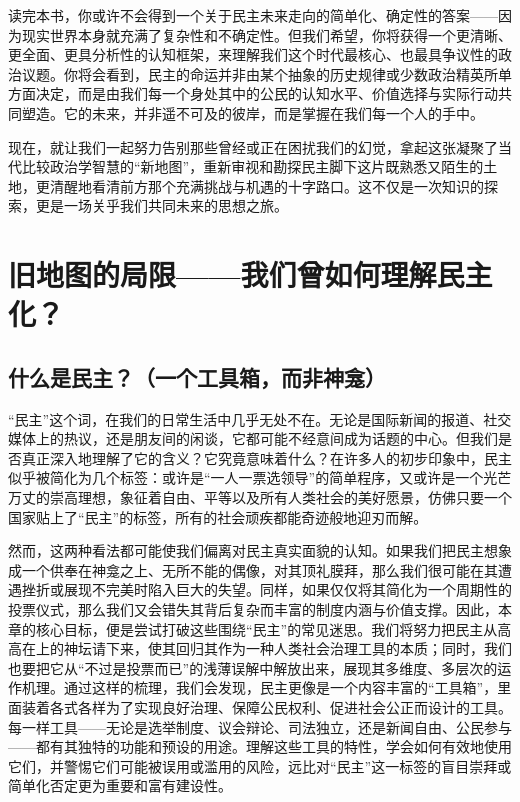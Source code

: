 \documentclass[UTF8, 10pt]{ctexbook}
\begin{document}
读完本书，你或许不会得到一个关于民主未来走向的简单化、确定性的答案——因为现实世界本身就充满了复杂性和不确定性。但我们希望，你将获得一个更清晰、更全面、更具分析性的认知框架，来理解我们这个时代最核心、也最具争议性的政治议题。你将会看到，民主的命运并非由某个抽象的历史规律或少数政治精英所单方面决定，而是由我们每一个身处其中的公民的认知水平、价值选择与实际行动共同塑造。它的未来，并非遥不可及的彼岸，而是掌握在我们每一个人的手中。

现在，就让我们一起努力告别那些曾经或正在困扰我们的幻觉，拿起这张凝聚了当代比较政治学智慧的“新地图”，重新审视和勘探民主脚下这片既熟悉又陌生的土地，更清醒地看清前方那个充满挑战与机遇的十字路口。这不仅是一次知识的探索，更是一场关乎我们共同未来的思想之旅。

\part{旧地图的局限——我们曾如何理解民主化？}

\chapter{什么是民主？（一个工具箱，而非神龛）}

\lettrine[lines=3]{“}{民主”}这个词，在我们的日常生活中几乎无处不在。无论是国际新闻的报道、社交媒体上的热议，还是朋友间的闲谈，它都可能不经意间成为话题的中心。但我们是否真正深入地理解了它的含义？它究竟意味着什么？在许多人的初步印象中，民主似乎被简化为几个标签：或许是“一人一票选领导”的简单程序，又或许是一个光芒万丈的崇高理想，象征着自由、平等以及所有人类社会的美好愿景，仿佛只要一个国家贴上了“民主”的标签，所有的社会顽疾都能奇迹般地迎刃而解。

然而，这两种看法都可能使我们偏离对民主真实面貌的认知。如果我们把民主想象成一个供奉在神龛之上、无所不能的偶像，对其顶礼膜拜，那么我们很可能在其遭遇挫折或展现不完美时陷入巨大的失望。同样，如果仅仅将其简化为一个周期性的投票仪式，那么我们又会错失其背后复杂而丰富的制度内涵与价值支撑。因此，本章的核心目标，便是尝试打破这些围绕“民主”的常见迷思。我们将努力把民主从高高在上的神坛请下来，使其回归其作为一种人类社会治理工具的本质；同时，我们也要把它从“不过是投票而已”的浅薄误解中解放出来，展现其多维度、多层次的运作机理。通过这样的梳理，我们会发现，民主更像是一个内容丰富的“工具箱”，里面装着各式各样为了实现良好治理、保障公民权利、促进社会公正而设计的工具。每一样工具——无论是选举制度、议会辩论、司法独立，还是新闻自由、公民参与——都有其独特的功能和预设的用途。理解这些工具的特性，学会如何有效地使用它们，并警惕它们可能被误用或滥用的风险，远比对“民主”这一标签的盲目崇拜或简单化否定更为重要和富有建设性。
\end{document}
